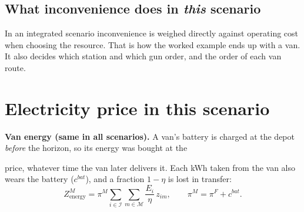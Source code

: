 \documentclass[11pt,a4paper]{article}
\newif\ifTOU \TOUfalse   %
\newif\ifSEQ \SEQfalse   %
\newcommand{\I}{\mathcal{I}}
\newcommand{\M}{\mathcal{M}}
\newcommand{\off}{\mathrm{off}}
\begin{document}
\subsection{What inconvenience does in \emph{this} scenario}
\ifSEQ
In a sequential scenario inconvenience \textbf{cannot move an EV from an FCS to a van}: Stage~1 sends every EV that \emph{can} use an FCS to one. It still matters inside each stage. In Stage~1 it decides \emph{which} station and \emph{when} (urgent EVs get the near station and the first free gun). In Stage~2 it decides the \emph{order} in which vans visit EVs (urgent EVs first). In the worked example, this scenario sends the driver 10\,km to the FCS. That is the weakness the integrated scenarios remove.
\else
In an integrated scenario inconvenience is weighed directly against operating cost when choosing the resource. That is how the worked example ends up with a van. It also decides which station and which gun order, and the order of each van route.
\fi

\section{Electricity price in this scenario}\label{sec:price}

\textbf{Van energy (same in all scenarios).} A van's battery is charged at the depot \emph{before} the horizon, so its energy was bought at the
\ifTOU off-peak \fi
price, whatever time the van later delivers it. Each kWh taken from the van also wears the battery ($c^{bat}$), and a fraction $1-\eta$ is lost in transfer:
\[
Z^M_{\text{energy}}=\pi^M\sum_{i\in\I}\sum_{m\in\M}\frac{E_i}{\eta}\,z_{im},\qquad \pi^M=\ifTOU\pi^\off\else\pi^F\fi+c^{bat}.
\]
\end{document}
